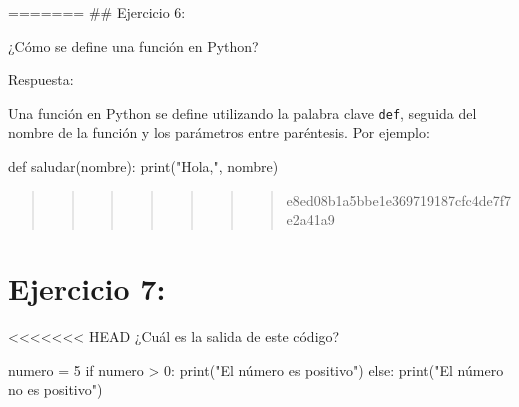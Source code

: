 \documentclass[
  a4paper,
  DIV=11,
  numbers=noendperiod,
  onepage,
  openany]{scrreprt}
\newenvironment{Shaded}{\begin{snugshade}}{\end{snugshade}}
\newcommand{\BuiltInTok}[1]{\textcolor[rgb]{0.00,0.23,0.31}{#1}}
\newcommand{\ControlFlowTok}[1]{\textcolor[rgb]{0.00,0.23,0.31}{#1}}
\newcommand{\DecValTok}[1]{\textcolor[rgb]{0.68,0.00,0.00}{#1}}
\newcommand{\KeywordTok}[1]{\textcolor[rgb]{0.00,0.23,0.31}{#1}}
\newcommand{\NormalTok}[1]{\textcolor[rgb]{0.00,0.23,0.31}{#1}}
\newcommand{\OperatorTok}[1]{\textcolor[rgb]{0.37,0.37,0.37}{#1}}
\newcommand{\StringTok}[1]{\textcolor[rgb]{0.13,0.47,0.30}{#1}}
\begin{document}
======= \#\# Ejercicio 6:

¿Cómo se define una función en Python?

Respuesta:

Una función en Python se define utilizando la palabra clave
\texttt{def}, seguida del nombre de la función y los parámetros entre
paréntesis. Por ejemplo:

\begin{Shaded}
\begin{Highlighting}[]
\KeywordTok{def}\NormalTok{ saludar(nombre):}
    \BuiltInTok{print}\NormalTok{(}\StringTok{"Hola,"}\NormalTok{, nombre)}
\end{Highlighting}
\end{Shaded}

\begin{quote}
\begin{quote}
\begin{quote}
\begin{quote}
\begin{quote}
\begin{quote}
\begin{quote}
e8ed08b1a5bbe1e369719187cfc4de7f7e2a41a9
\end{quote}
\end{quote}
\end{quote}
\end{quote}
\end{quote}
\end{quote}
\end{quote}

\hypertarget{ejercicio-7}{%
\chapter{Ejercicio 7:}\label{ejercicio-7}}

\textless\textless\textless\textless\textless\textless\textless{} HEAD
¿Cuál es la salida de este código?

\begin{Shaded}
\begin{Highlighting}[]
\NormalTok{numero }\OperatorTok{=} \DecValTok{5}
\ControlFlowTok{if}\NormalTok{ numero }\OperatorTok{\textgreater{}} \DecValTok{0}\NormalTok{:}
    \BuiltInTok{print}\NormalTok{(}\StringTok{"El número es positivo"}\NormalTok{)}
\ControlFlowTok{else}\NormalTok{:}
    \BuiltInTok{print}\NormalTok{(}\StringTok{"El número no es positivo"}\NormalTok{)}
\end{Highlighting}
\end{Shaded}
\end{document}
